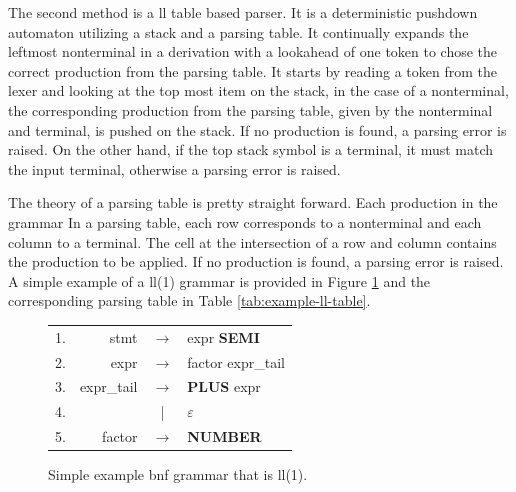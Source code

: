 The second method is a \gls{ll} table based parser. It is a deterministic pushdown automaton utilizing a stack and a parsing table. It continually expands the leftmost nonterminal in a derivation with a lookahead of one token to chose the correct production from the parsing table. It starts by reading a token from the lexer and looking at the top most item on the stack, in the case of a nonterminal, the corresponding production from the parsing table, given by the nonterminal and terminal, is pushed on the stack. If no production is found, a parsing error is raised. On the other hand, if the top stack symbol is a terminal, it must match the input terminal, otherwise a parsing error is raised.

The theory of a parsing table is pretty straight forward. Each production in the grammar 
In a parsing table, each row corresponds to a nonterminal and each column to a terminal. The cell at the intersection of a row and column contains the production to be applied. If no production is found, a parsing error is raised. A simple example of a \gls{ll}(1) grammar is provided in Figure \ref{tab:example-bfn-ll} and the corresponding parsing table in Table \ref{tab:example-ll-table}.

\begin{figure}[H]
\centering
\begin{table}[H]
\centering
\begin{tabular}{l|rcl}
1. & stmt       & $\rightarrow$ & expr \textbf{SEMI}			\\
2. & expr       & $\rightarrow$ & factor expr\_tail			\\
3. & expr\_tail & $\rightarrow$ & \textbf{PLUS} expr			\\
4. &            & |             & $\varepsilon$					\\
5. & factor     & $\rightarrow$ & \textbf{NUMBER}          
\end{tabular}
\label{tab:example-bfn-ll}
\end{table}
\caption{Simple example \gls{bnf} grammar that is \gls{ll}(1).}
\end{figure}

